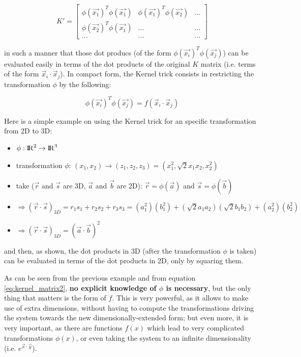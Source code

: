 \documentclass[paper=a4, fontsize=11pt]{scrartcl} %
\numberwithin{equation}{section} %
\numberwithin{figure}{section} %
\numberwithin{table}{section} %
\begin{document}
\[
K'=
  \begin{bmatrix}
    \phi(\vec{x_{1}})^{T}\phi(\vec{x_{1}}) & \phi(\vec{x_{1}})^{T}\phi(\vec{x_{2}}) & ...  \\
    \phi(\vec{x_{2}})^{T}\phi(\vec{x_{1}}) & ... & ...  \\
    ... & ... & ...
  \end{bmatrix}
\]

in such a manner that those dot producs (of the form $\phi(\vec{x_{i}})^{T}\phi(\vec{x_{j}})$) can be evaluated easily in terms of the dot products of the original $K$ matrix (i.e. terms of the form $\vec{x}_{i}\cdot \vec{x}_{j}$). In compact form, the Kernel trick consists in restricting the transformation $\phi$ by the following:

\begin{equation}
\phi(\vec{x_{i}})^{T}\phi(\vec{x_{j}}) = f(\vec{x}_{i}\cdot \vec{x}_{j})
\label{eq:kernel_matrix2}
\end{equation}


Here is a simple example on using the Kernel trick for an specific transformation from 2D to 3D:

\begin{itemize}
\item $\phi: {\rm I\!R}^{2}\rightarrow {\rm I\!R}^{3}$
\item transformation $\phi$: $(x_{1}, x_{2})\rightarrow (z_{1}, z_{2}, z_{3}) = (x_{1}^{2}, \sqrt{2}x_{1}x_{2}, x_{2}^{2})$
\item take ($\vec{r}$ and $\vec{s}$ are 3D, $\vec{a}$ and $\vec{b}$ are 2D): $\vec{r} = \phi(\vec{a})$ and $\vec{s} = \phi(\vec{b})$
\item $\Rightarrow (\vec{r}\cdot\vec{s})_{3D} = r_{1}s_{1}+r_{2}s_{2}+r_{3}s_{3} = (a_{1}^{2})(b_{1}^{2})+(\sqrt{2}a_{1}a_{2})(\sqrt{2}b_{1}b_{2})+(a_{2}^{2})(b_{2}^{2})$
\item $\Rightarrow (\vec{r}\cdot\vec{s})_{3D} = (\vec{a}\cdot\vec{b})^{2}$
\end{itemize}

and then, as shown, the dot products in 3D (after the transformation $\phi$ is taken) can be evaluated in terms of the dot products in 2D, only by squaring them.

As can be seen from the previous example and from equation \ref{eq:kernel_matrix2}, \textbf{no explicit knowledge of $\phi$ is necessary}, but the only thing that matters is the form of $f$. This is very powerful, as it allows to make use of extra dimensions, without having to compute the transformations driving the system towards the new dimensionally-extended form; but even more, it is very important, as there are functions $f(x)$ which lead to very complicated transformations $\phi(x)$, or even taking the system to an infinite dimensionality (i.e. $e^{\vec{x}\cdot \vec{y}}$).
\end{document}
